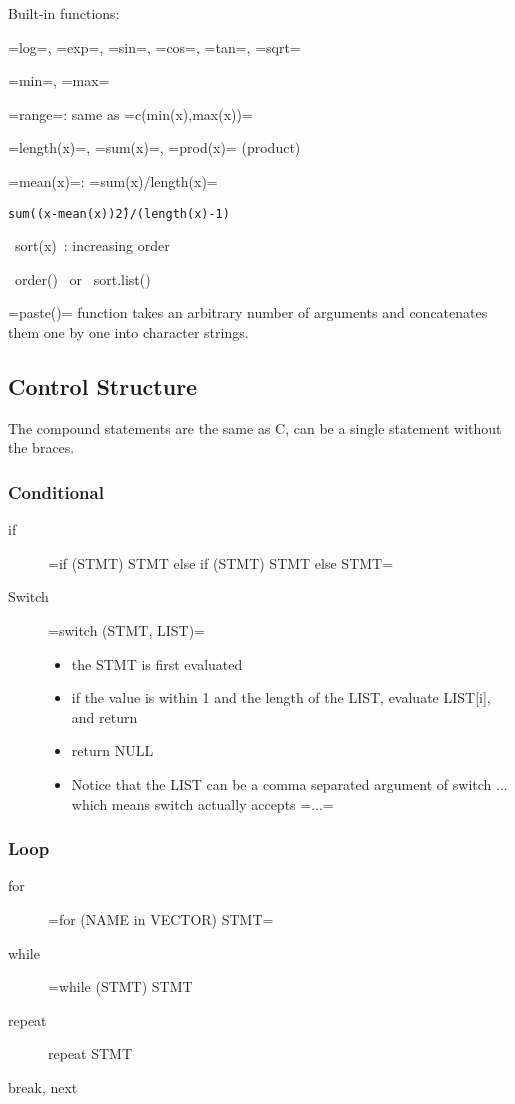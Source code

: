Built-in functions:
\begin{description}
\item =log=, =exp=, =sin=, =cos=, =tan=, =sqrt=
\item =min=, =max=
\item =range=: same as =c(min(x),max(x))=
\item =length(x)=, =sum(x)=, =prod(x)= (product)
\item =mean(x)=: =sum(x)/length(x)=
\item [var(x)] \texttt{sum((x-mean(x))\^2)/(length(x)-1)}
\item ~sort(x)~: increasing order
\item ~order()~ or ~sort.list()~
\item =paste()= function takes an arbitrary number of arguments and
  concatenates them one by one into character strings.
\end{description}


\subsection{Control Structure}
The compound statements are the same as C, can be a single statement without the braces.
\subsubsection{Conditional}
\begin{description}
\item [if] =if (STMT) STMT else if (STMT) STMT else STMT=
\item [Switch] =switch (STMT, LIST)=
  \begin{itemize}
  \item the STMT is first evaluated
  \item if the value is within 1 and the length of the LIST, evaluate LIST[i], and return
  \item return NULL
  \item Notice that the LIST can be a comma separated argument of
    switch ... which means switch actually accepts =...=
\end{itemize}
\end{description}

\subsubsection{Loop}
\begin{description}
\item [for] =for (NAME in VECTOR) STMT=
\item [while] =while (STMT) STMT
\item [repeat] repeat STMT
\item [break, next]
\end{description}

